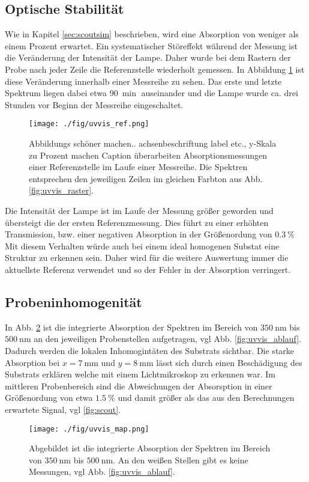 \subsection{Optische Stabilität}
Wie in Kapitel \ref{sec:scoutsim} beschrieben, wird eine Absorption von weniger als einem Prozent erwartet.
Ein systematischer Störeffekt während der Messung ist die Veränderung der Intensität der Lampe.
Daher wurde bei dem Rastern der Probe nach jeder Zeile die Referenzstelle wiederholt gemessen.
In Abbildung \ref{fig:uvvis_ref} ist diese Veränderung innerhalb einer Messreihe zu sehen.
Das erste und letzte Spektrum liegen dabei etwa $\SI{90}{\min}$ auseinander und die Lampe wurde ca. drei Stunden vor Beginn der Messreihe eingeschaltet.
\begin{figure}
    \centering
    \texttt{[image: ./fig/uvvis\_ref.png]}
    \caption{Abbildungs schöner machen.. achsenbeschriftung label etc., y-Skala zu Prozent machen Caption überarbeiten
    Absorptionsmessungen einer Referenzstelle im Laufe einer Messreihe.
    Die Spektren entsprechen den jeweiligen Zeilen im gleichen Farbton aus Abb. \ref{fig:uvvis_raster}.}
    \label{fig:uvvis_ref}
\end{figure}
Die Intensität der Lampe ist im Laufe der Messung größer geworden und übersteigt die der ersten Referenzmessung. 
Dies führt zu einer erhöhten Transmission, bzw. einer negativen Absorption in der Größenordung von $\SI{0.3}{\%}$
Mit diesem Verhalten würde auch bei einem ideal homogenen Substat eine Struktur zu erkennen sein.
Daher wird für die weitere Auswertung immer die aktuellste Referenz verwendet und so der Fehler in der Absorption verringert.
\subsection{Probeninhomogenität}
In Abb. \ref{fig:uvvis_map} ist die integrierte Absorption der Spektren im Bereich von $\SI{350}{\nm}$ bis $\SI{500}{\nm}$ an den jeweiligen Probenstellen aufgetragen, vgl Abb. \ref{fig:uvvis_ablauf}.
Dadurch werden die lokalen Inhomogintäten des Substrats sichtbar.
Die starke Absorption bei $x=\SI{7}{\mm}$ und $y=\SI{8}{\mm}$ lässt sich durch einen Beschädigung des Substrats erklären welche mit einem Lichtmikroskop zu erkennen war.
Im mittleren Probenbereich sind die Abweichungen der Absorsption in einer Größenordung von etwa $\SI{1.5}{\%}$ und damit größer als das aus den Berechnungen erwartete Signal, vgl \ref{fig:scout}.
\begin{figure}
    \centering
    \texttt{[image: ./fig/uvvis\_map.png]}
    \caption{Abgebildet ist die integrierte Absorption der Spektren im Bereich von $\SI{350}{\nm}$ bis $\SI{500}{\nm}$. An den weißen Stellen gibt es keine Messungen, vgl Abb. \ref{fig:uvvis_ablauf}.}
    \label{fig:uvvis_map}
\end{figure}


